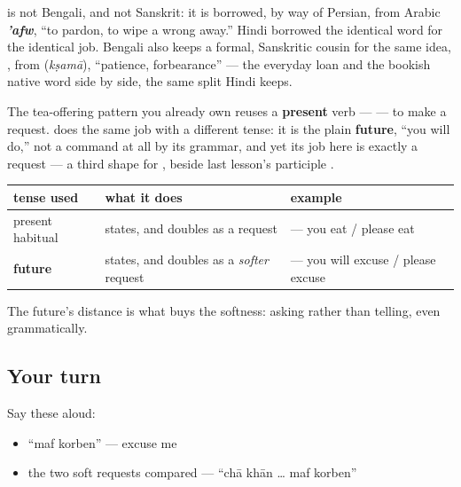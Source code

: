 \begin{cousinweb}
\textbf{} is not Bengali, and not Sanskrit: it is borrowed, by way of Persian, from Arabic \emph{\textbf{'afw}}, \textquotedblleft{}to pardon, to wipe a wrong away.\textquotedblright{} Hindi borrowed the identical word for the identical job. Bengali also keeps a formal, Sanskritic cousin for the same idea, \textbf{ }, from \textbf{} (\emph{kṣamā}), \textquotedblleft{}patience, forbearance\textquotedblright{} — the everyday loan and the bookish native word side by side, the same split Hindi keeps.
\end{cousinweb}

\begin{grammarlens}[title={Grammar Lens: the future, asked to be gentle}]
The tea-offering pattern you already own reuses a \textbf{present} verb —   — to make a request. \textbf{} does the same job with a different tense: it is the plain \textbf{future}, \textquotedblleft{}you will do,\textquotedblright{} not a command at all by its grammar, and yet its job here is exactly a request — a third shape for , beside last lesson's participle \textbf{}.

\noindent
\begin{tabularx}{\linewidth}{@{}>{\raggedright\arraybackslash}X>{\raggedright\arraybackslash}X>{\raggedright\arraybackslash}X@{}}
\toprule
\textbf{tense used} & \textbf{what it does} & \textbf{example} \\
\midrule
present habitual & states, and doubles as a request & \bn{আপনি} \bn{খান} — you eat / please eat \\
\textbf{future} & states, and doubles as a \emph{softer} request & \textbf{\bn{মাফ} \bn{করবেন}} — you will excuse / please excuse \\
\bottomrule
\end{tabularx}

The future's distance is what buys the softness: asking rather than telling, even grammatically.
\end{grammarlens}

\subsection*{Your turn}
Say these aloud:

\begin{itemize}
\raggedright
  \item \textquotedblleft{}maf korben\textquotedblright{} — excuse me
  \item the two soft requests compared — \textquotedblleft{}chā khān … maf korben\textquotedblright{}
\end{itemize}

